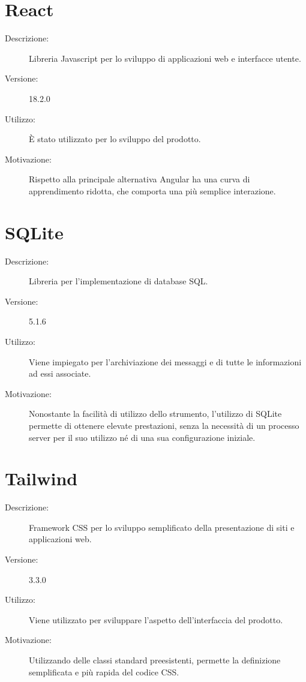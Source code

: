 \section{React}
\begin{description}
\item[Descrizione:] Libreria Javascript per lo sviluppo di applicazioni web e interfacce utente.
\item[Versione:] 18.2.0
\item[Utilizzo:] È stato utilizzato per lo sviluppo del prodotto.
\item[Motivazione:] Rispetto alla principale alternativa Angular ha una curva di apprendimento ridotta, che comporta una più semplice interazione.
\end{description}

\section{SQLite}
\begin{description}
\item[Descrizione:] Libreria per l'implementazione di database SQL.
\item[Versione:] 5.1.6
\item[Utilizzo:] Viene impiegato per l'archiviazione dei messaggi e di tutte le informazioni ad essi associate.
\item[Motivazione:] Nonostante la facilità di utilizzo dello strumento, l'utilizzo di SQLite permette di ottenere elevate prestazioni, senza la necessità di un processo server per il suo utilizzo né di una sua configurazione iniziale.
\end{description}

\section{Tailwind}
\begin{description}
\item[Descrizione:] Framework CSS per lo sviluppo semplificato della presentazione di siti e applicazioni web.
\item[Versione:] 3.3.0
\item[Utilizzo:] Viene utilizzato per sviluppare l'aspetto dell'interfaccia del prodotto.
\item[Motivazione:] Utilizzando delle classi standard preesistenti, permette la definizione semplificata e più rapida del codice CSS.
\end{description}

